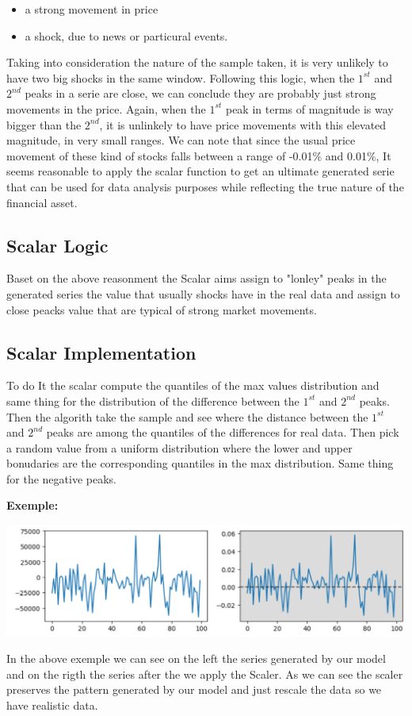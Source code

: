 \documentclass{article}
\begin{document}
\begin{multicols}{2}
    \begin{itemize}
        \item a strong movement in price
        \item a shock, due to news or particural events.
    \end{itemize}  
    Taking into consideration the nature of the sample taken, it is very unlikely to have two big shocks in the same window. Following this logic, when the $1^{st}$ and $2^{nd}$ peaks in a serie are close, we can conclude they are probably just strong movements in the price. Again, when the $1^{st}$ peak in terms of magnitude is way bigger than the $2^{nd}$, it is unlinkely to have price movements with this elevated magnitude, in very small ranges. We can note that since the usual price movement of these kind of stocks falls between a range of -0.01\% and 0.01\%, It seems reasonable to apply the scalar function to get an ultimate generated serie that can be used for data analysis purposes while reflecting the true nature of the financial asset. 
    \subsection*{Scalar Logic}
    Baset on the above reasonment the Scalar aims assign to "lonley" peaks in the generated series the value that usually shocks have in the real data 
    and assign to close peacks value that are typical of strong market movements.
    \subsection*{Scalar Implementation}
    To do It the scalar compute the quantiles of the max values distribution and same thing for the distribution of the difference between the $1^{st}$ and 
    $2^{nd}$ peaks.\\
    Then the algorith take the sample and see where the distance between the $1^{st}$ and $2^{nd}$ peaks are among the quantiles of the differences for real 
    data. Then pick a random value from a uniform distribution where the lower and upper bonudaries are the corresponding quantiles in the max distribution. 
    Same thing for the negative peaks.
    \end{multicols}
    \textbf{Exemple:}
    \begin{center}
        \includegraphics[scale=0.6]{imgs/EX_03.png}
    \end{center}
    In the above exemple we can see on the left the series generated by our model and on the rigth the series after the we apply the Scaler. As we can see 
    the scaler preserves the pattern generated by our model and just rescale the data so we have realistic data.
\end{document}
